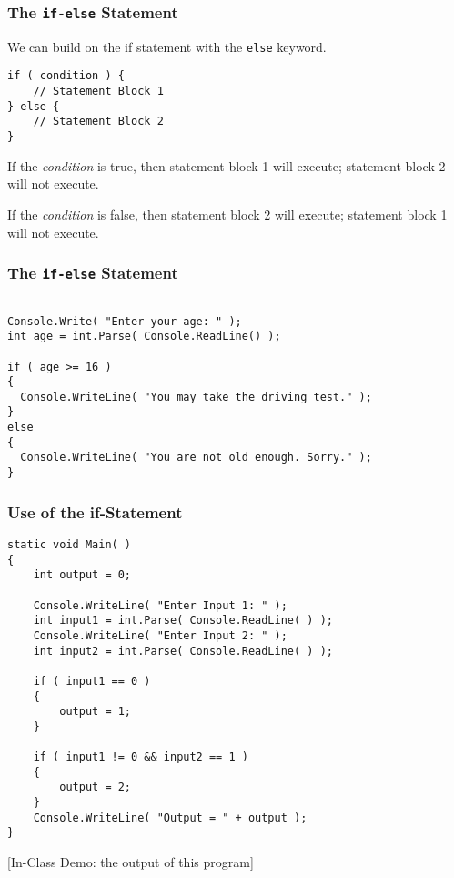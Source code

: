 \begin{frame}[fragile]
\frametitle{The \texttt{if-else} Statement}

We can build on the if statement with the \texttt{else} keyword.

\begin{verbatim}
if ( condition ) {
    // Statement Block 1
} else {
    // Statement Block 2
}
\end{verbatim}

If the \textit{condition} is true, then statement block 1 will execute; statement block 2 will not execute.

If the \textit{condition} is false, then statement block 2 will execute; statement block 1 will not execute.


\end{frame}

\begin{frame}[fragile]
\frametitle{The \texttt{if-else} Statement}

\begin{verbatim}

Console.Write( "Enter your age: " );
int age = int.Parse( Console.ReadLine() );

if ( age >= 16 )
{
  Console.WriteLine( "You may take the driving test." );
}
else 
{
  Console.WriteLine( "You are not old enough. Sorry." );
}
\end{verbatim}

\end{frame}


\begin{frame}[fragile]
\frametitle{Use of the if-Statement}

{\scriptsize
\begin{verbatim}
static void Main( )
{
    int output = 0;

    Console.WriteLine( "Enter Input 1: " ); 
    int input1 = int.Parse( Console.ReadLine( ) );
    Console.WriteLine( "Enter Input 2: " ); 
    int input2 = int.Parse( Console.ReadLine( ) );

    if ( input1 == 0 )
    {
        output = 1; 
    }

    if ( input1 != 0 && input2 == 1 )		
    {				
        output = 2; 			
    }				
    Console.WriteLine( "Output = " + output );
}
\end{verbatim}
}

[In-Class Demo: the output of this program]

\end{frame}

